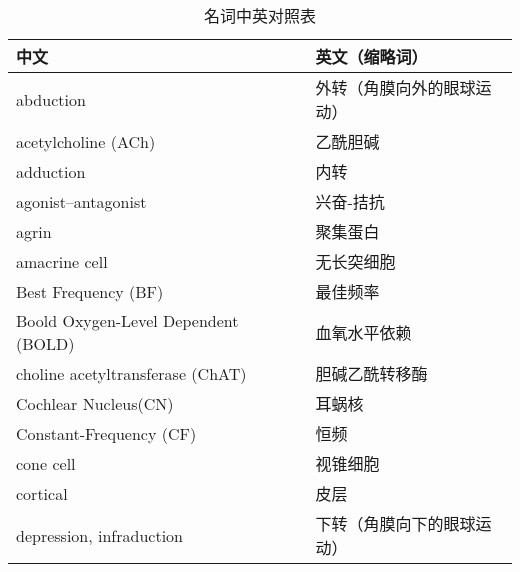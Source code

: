 
\renewcommand\arraystretch{1.0}	%
\begin{longtable}{lll}
\caption{名词中英对照表 \label{tab:0_1}} \\
	\toprule 
 中文   && 英文（缩略词） \\
 
 	\midrule
 	abduction     && 外转（角膜向外的眼球运动）   \\
 
	\midrule
	acetylcholine (ACh)     && 乙酰胆碱   \\
	
	\midrule
	adduction     && 内转   \\
	
	\midrule
	agonist–antagonist     &&  兴奋-拮抗  \\
	
	\midrule
	agrin     &&  聚集蛋白  \\
	
	\midrule
	amacrine cell     && 无长突细胞   \\
 
	\midrule
	Best Frequency (BF)     && 最佳频率   \\
 
	\midrule
	Boold Oxygen-Level Dependent (BOLD)     && 血氧水平依赖   \\
	
	\midrule
	choline acetyltransferase (ChAT)   && 胆碱乙酰转移酶  \\
	
	\midrule
	Cochlear Nucleus(CN)   && 耳蜗核  \\
	
	\midrule
	Constant-Frequency (CF)     &&  恒频  \\
	
	\midrule
	cone cell      && 视锥细胞  \\
	
	\midrule
	cortical     &&  皮层  \\
	
	\midrule
	depression, infraduction     &&  下转（角膜向下的眼球运动）  \\
	

\end{longtable}
